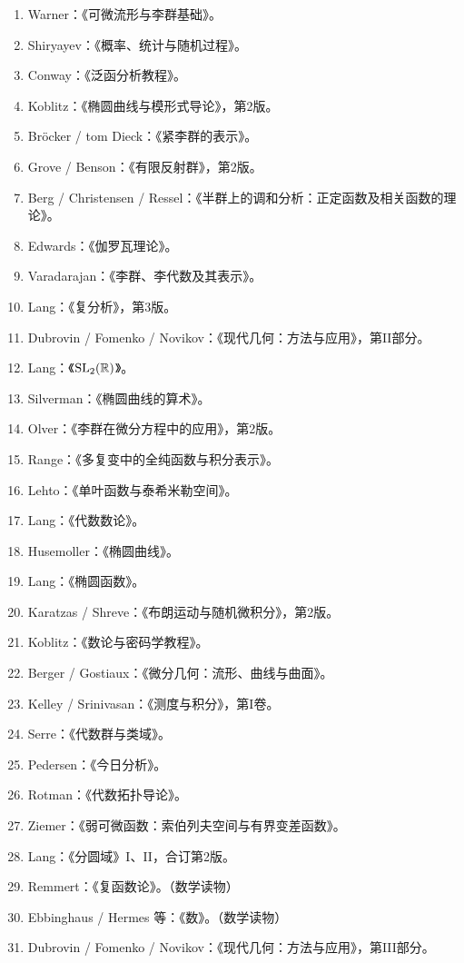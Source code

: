 \begin{enumerate}[leftmargin=3em,label=\arabic*.]
\item Warner：《可微流形与李群基础》。
\item Shiryayev：《概率、统计与随机过程》。
\item Conway：《泛函分析教程》。
\item Koblitz：《椭圆曲线与模形式导论》，第2版。
\item Bröcker / tom Dieck：《紧李群的表示》。
\item Grove / Benson：《有限反射群》，第2版。
\item Berg / Christensen / Ressel：《半群上的调和分析：正定函数及相关函数的理论》。
\item Edwards：《伽罗瓦理论》。
\item Varadarajan：《李群、李代数及其表示》。
\item Lang：《复分析》，第3版。
\item Dubrovin / Fomenko / Novikov：《现代几何：方法与应用》，第II部分。
\item Lang：《$\mathrm{SL}_2(\mathbb R)$》。
\item Silverman：《椭圆曲线的算术》。
\item Olver：《李群在微分方程中的应用》，第2版。
\item Range：《多复变中的全纯函数与积分表示》。
\item Lehto：《单叶函数与泰希米勒空间》。
\item Lang：《代数数论》。
\item Husemoller：《椭圆曲线》。
\item Lang：《椭圆函数》。
\item Karatzas / Shreve：《布朗运动与随机微积分》，第2版。
\item Koblitz：《数论与密码学教程》。
\item Berger / Gostiaux：《微分几何：流形、曲线与曲面》。
\item Kelley / Srinivasan：《测度与积分》，第I卷。
\item Serre：《代数群与类域》。
\item Pedersen：《今日分析》。
\item Rotman：《代数拓扑导论》。
\item Ziemer：《弱可微函数：索伯列夫空间与有界变差函数》。
\item Lang：《分圆域》I、II，合订第2版。
\item Remmert：《复函数论》。（数学读物）
\item Ebbinghaus / Hermes 等：《数》。（数学读物）
\item Dubrovin / Fomenko / Novikov：《现代几何：方法与应用》，第III部分。

\end{enumerate}

